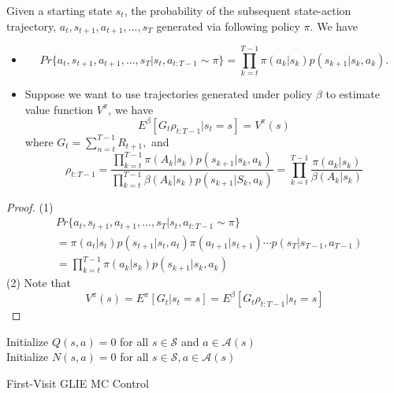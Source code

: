 \begin{refsection}
\begin{lemma}
Given a starting state $s_t$, the probability of the subsequent state-action trajectory, $a_t, s_{t+1}, a_{t+1},...,s_T$ generated via following policy $\pi$. We have
\begin{itemize}
	\item 
$$Pr\{a_{t}, s_{t+1}, a_{t+1}, \ldots, s_{T} | s_{t}, a_{t: T-1} \sim \pi\} = \prod_{k=t}^{T-1} \pi\left(a_{k} | s_{k}\right) p\left(s_{k+1} | s_{k}, a_{k}\right).$$
\item Suppose we want to use trajectories generated under policy $\beta$ to estimate value function $V^\pi$, we have
	$$E^\beta[G_t \rho_{t:T-1} | s_t = s] = V^\pi(s)$$
where $G_t = \sum_{n=t}^{T-1} R_{t+1},$ and
	$$\rho_{t: T-1} = \frac{\prod_{k=t}^{T-1} \pi\left(A_{k} | s_{k}\right) p\left(s_{k+1} | s_{k}, a_{k}\right)}{\prod_{k=t}^{T-1} \beta\left(A_{k} | s_{k}\right) p\left(s_{k+1} | S_{k}, a_{k}\right)}=\prod_{k=t}^{T-1} \frac{\pi\left(a_{k} | s_{k}\right)}{\beta\left(A_{k} | s_{k}\right)}$$
\end{itemize}	
\end{lemma}
\begin{proof}
(1)
\begin{align*}
&Pr\{a_{t}, s_{t+1}, a_{t+1}, \ldots, s_{T} | s_{t}, a_{t: T-1} \sim \pi\} 
\\ 
&=\pi\left(a_{t} | s_{t}\right) p\left(s_{t+1} | s_{t}, a_{t}\right) \pi\left(a_{t+1} | s_{t+1}\right) \cdots p\left(s_{T} | s_{T-1}, a_{T-1}\right) \\ 
&=\prod_{k=t}^{T-1} \pi\left(a_{k} | s_{k}\right) p\left(s_{k+1} | s_{k}, a_{k}\right)
\end{align*}
(2) Note that 
$$V^\pi(s) = E^\pi[G_t|s_t = s] = E^\beta[G_t\rho_{t:T-1} | s_t = s]$$
	
\end{proof}





\begin{algorithm}
	Initialize $Q(s,a) = 0$ for all $s\in\mathcal{S}$ and $a\in\mathcal{A}(s)$ \\
	Initialize $N(s,a) = 0$ for all $s\in\mathcal{S}, a\in\mathcal{A}(s)$ \\
	\KwRet{$\pi$}
	\caption{First-Visit GLIE MC Control}
\end{algorithm}



\end{refsection}
